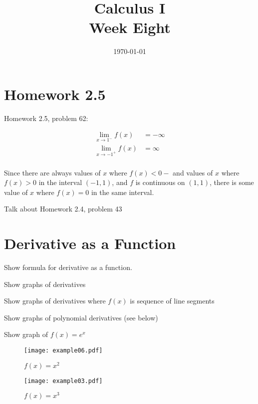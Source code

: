 \documentclass[letterpaper, landscape]{exam}
\author{}
\date{\today}
\title{Calculus I \\ Week Eight}
\begin{document}
  \maketitle
  \tableofcontents

  \section{Homework 2.5}

  Homework 2.5, problem 62: 
  \begin{solution}
    \begin{align*}
      \lim_{x \to 1^-} f(x) &= - \infty \\ 
      \lim_{x \to -1^+} f(x) &= \infty \\ 
    \end{align*}

    Since there are always values of $x$ where $f(x) < 0-$ and values of
    $x$ where $f(x) > 0$ in the interval $(-1, 1)$, and $f$ is continuous on $(1, 1)$,
    there is some value of $x$ where $f(x) = 0$ in the same interval.

  \end{solution}

  Talk about Homework 2.4, problem 43

  \section{Derivative as a Function}

  \begin{itemize*}
    \item Show formula for derivative as a function.
    \item Show graphs of derivatives
    \item Show graphs of derivatives where $f(x)$ is sequence of line segments
    \item Show graphs of polynomial derivatives (see below)
    \item Show graph of $f(x) = e^x$
  \end{itemize*}

  \begin{figure}[H]
    \centering
    \texttt{[image: example06.pdf]}
    \caption{$f(x) = x^2$}
    \label{fig:example06}
  \end{figure}

  \begin{figure}[H]
    \centering
    \texttt{[image: example03.pdf]}
    \caption{$f(x) = x^3$}
    \label{fig:example03}
  \end{figure}
\end{document}
